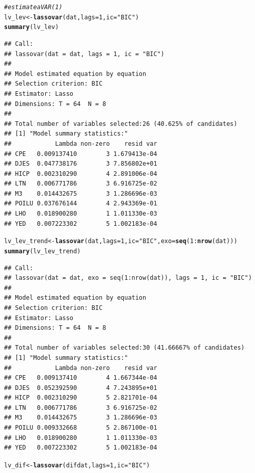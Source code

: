 \documentclass[11pt,oneside, a4paper]{amsart}\usepackage[]{graphicx}\usepackage[]{color}
\makeatletter
\newcommand{\hlnum}[1]{\textcolor[rgb]{0.686,0.059,0.569}{#1}}%
\newcommand{\hlstr}[1]{\textcolor[rgb]{0.192,0.494,0.8}{#1}}%
\newcommand{\hlcom}[1]{\textcolor[rgb]{0.678,0.584,0.686}{\textit{#1}}}%
\newcommand{\hlopt}[1]{\textcolor[rgb]{0,0,0}{#1}}%
\newcommand{\hlstd}[1]{\textcolor[rgb]{0.345,0.345,0.345}{#1}}%
\newcommand{\hlkwb}[1]{\textcolor[rgb]{0.69,0.353,0.396}{#1}}%
\newcommand{\hlkwc}[1]{\textcolor[rgb]{0.333,0.667,0.333}{#1}}%
\newcommand{\hlkwd}[1]{\textcolor[rgb]{0.737,0.353,0.396}{\textbf{#1}}}%
\newenvironment{kframe}{%
 \def\at@end@of@kframe{}%
 \ifinner\ifhmode%
  \def\at@end@of@kframe{\end{minipage}}%
  \begin{minipage}{\columnwidth}%
 \fi\fi%
 \def\FrameCommand##1{\hskip\@totalleftmargin \hskip-\fboxsep
 \colorbox{shadecolor}{##1}\hskip-\fboxsep
     \hskip-\linewidth \hskip-\@totalleftmargin \hskip\columnwidth}%
 \MakeFramed {\advance\hsize-\width
   \@totalleftmargin\z@ \linewidth\hsize
   \@setminipage}}%
 {\par\unskip\endMakeFramed%
 \at@end@of@kframe}
\newenvironment{knitrout}{}{} %
\makeatother
\begin{document}
\begin{knitrout}
\color{fgcolor}\begin{kframe}
\begin{alltt}
\hlcom{# estimate a VAR(1)}
\hlstd{lv_lev}\hlkwb{<-}\hlkwd{lassovar}\hlstd{(dat,}\hlkwc{lags}\hlstd{=}\hlnum{1}\hlstd{,} \hlkwc{ic}\hlstd{=}\hlstr{"BIC"}\hlstd{)}
\hlkwd{summary}\hlstd{(lv_lev)}
\end{alltt}
\begin{verbatim}
## Call:
## lassovar(dat = dat, lags = 1, ic = "BIC")
## 
## Model estimated equation by equation
## Selection criterion: BIC
## Estimator: Lasso
## Dimensions: T = 64  N = 8
## 
## Total number of variables selected:26 (40.625% of candidates)
## [1] "Model summary statistics:"
##            Lambda non-zero    resid var
## CPE   0.009137410        3 1.679413e-04
## DJES  0.047738176        3 7.856802e+01
## HICP  0.002310290        4 2.891006e-04
## LTN   0.006771786        3 6.916725e-02
## M3    0.014432675        3 1.286696e-03
## POILU 0.037676144        4 2.943369e-01
## LHO   0.018900280        1 1.011330e-03
## YED   0.007223302        5 1.002183e-04
\end{verbatim}
\begin{alltt}
\hlstd{lv_lev_trend}\hlkwb{<-}\hlkwd{lassovar}\hlstd{(dat,}\hlkwc{lags}\hlstd{=}\hlnum{1}\hlstd{,} \hlkwc{ic}\hlstd{=}\hlstr{"BIC"}\hlstd{,}\hlkwc{exo}\hlstd{=}\hlkwd{seq}\hlstd{(}\hlnum{1}\hlopt{:}\hlkwd{nrow}\hlstd{(dat)))}
\hlkwd{summary}\hlstd{(lv_lev_trend)}
\end{alltt}
\begin{verbatim}
## Call:
## lassovar(dat = dat, exo = seq(1:nrow(dat)), lags = 1, ic = "BIC")
## 
## Model estimated equation by equation
## Selection criterion: BIC
## Estimator: Lasso
## Dimensions: T = 64  N = 8
## 
## Total number of variables selected:30 (41.66667% of candidates)
## [1] "Model summary statistics:"
##            Lambda non-zero    resid var
## CPE   0.009137410        4 1.667344e-04
## DJES  0.052392590        4 7.243895e+01
## HICP  0.002310290        5 2.821701e-04
## LTN   0.006771786        3 6.916725e-02
## M3    0.014432675        3 1.286696e-03
## POILU 0.009332668        5 2.867100e-01
## LHO   0.018900280        1 1.011330e-03
## YED   0.007223302        5 1.002183e-04
\end{verbatim}
\begin{alltt}
\hlstd{lv_dif}\hlkwb{<-}\hlkwd{lassovar}\hlstd{(difdat,}\hlkwc{lags}\hlstd{=}\hlnum{1}\hlstd{,} \hlkwc{ic}\hlstd{=}\hlstr{"BIC"}\hlstd{)}

\end{alltt}
\end{kframe}
\end{knitrout}
\end{document}
